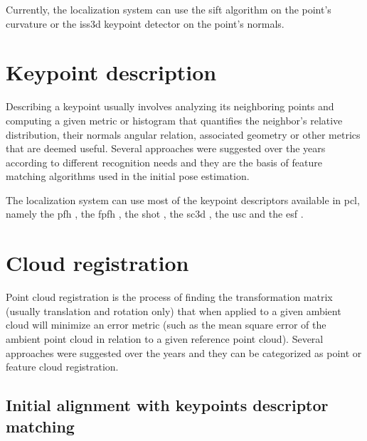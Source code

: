 Currently, the localization system can use the \gls{sift} \cite{Lowe2004} algorithm on the point's curvature or the \gls{iss3d} \cite{Zhong2009} keypoint detector on the point's normals.



\section{Keypoint description}

Describing a keypoint usually involves analyzing its neighboring points and computing a given metric or histogram that quantifies the neighbor's relative distribution, their normals angular relation, associated geometry or other metrics that are deemed useful. Several approaches were suggested over the years according to different recognition needs and they are the basis of feature matching algorithms used in the initial pose estimation.

The localization system can use most of the keypoint descriptors available in \gls{pcl}, namely the \gls{pfh} \cite{Rusu2008a}, the \gls{fpfh} \cite{Rusu2009}, the \gls{shot} \cite{Tombari2011}, the \gls{sc3d} \cite{Frome2004}, the \gls{usc} \cite{Tombari2010} and the \gls{esf} \cite{Wohlkinger2011}.



\section{Cloud registration}

Point cloud registration is the process of finding the transformation matrix (usually translation and rotation only) that when applied to a given ambient cloud will minimize an error metric (such as the mean square error of the ambient point cloud in relation to a given reference point cloud). Several approaches were suggested over the years and they can be categorized as point or feature cloud registration.


\subsection{Initial alignment with keypoints descriptor matching}\label{subsec:localization-system_feature-registration}

